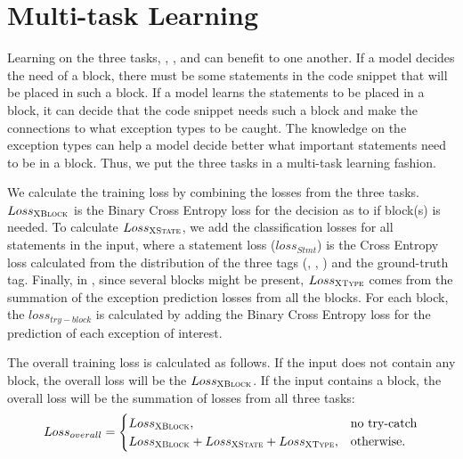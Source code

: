 \section{Multi-task Learning}
\label{sec:multitasking}

Learning on the three tasks, {\xblock}, {\xstate}, and {\xtype}
can benefit to one another. If a model decides the need
of a  block, there must be some statements in the code
snippet that will be placed in such a block. If a model learns the
statements to be placed in a  block, it can decide
that the code snippet needs such a block and make the connections to
what exception types to be caught. The knowledge on the exception
types can help a model decide better what important statements need to
be in a  block. Thus, we put the three tasks
in a multi-task learning fashion.


We calculate the training loss by combining the losses from the three
tasks. $Loss_{{\textsc{XBlock}}}$ is the Binary Cross Entropy loss for the
decision as to if  block(s) is needed.
%
To calculate $Loss_{{\textsc{XState}}}$, we add the classification losses for
all statements in the input, where a statement loss ($loss_{Stmt}$) is
the Cross Entropy loss calculated from the distribution of the three
tags (, , ) and the ground-truth tag.
%
%
Finally, in \xtype, since several  blocks might be
present, $Loss_{{\textsc{XType}}}$ comes from the summation of the exception
prediction losses from all the  blocks. For each
 block, the $loss_{try-block}$ is calculated by adding
the Binary Cross Entropy loss for the prediction of each exception of
interest.

The overall training loss is calculated as follows. If the input does
not contain any  block, the overall loss will be the 
$Loss_{{\textsc{XBlock}}}$. If the input contains a  block,
the overall loss will be the summation of losses from all
three tasks:
\begin{equation}
\label{eqn:loss}
Loss_{overall} =
\begin{cases}
Loss_{{\textsc{XBlock}}},  & \text{no try-catch}\\
Loss_{{\textsc{XBlock}}} + Loss_{{\textsc{XState}}} + Loss_{{\textsc{XType}}}, &\text{otherwise.}
\end{cases}
\end{equation}
